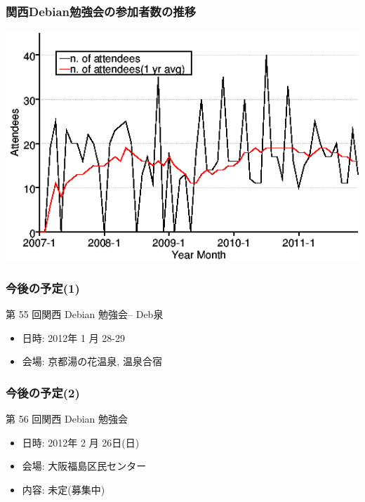 \documentclass[cjk,dvipdfmx,10pt,%
hyperref={bookmarks=true,bookmarksnumbered=true,bookmarksopen=false,%
colorlinks=false,%
pdftitle={第 54 回 関西 Debian 勉強会},%
pdfauthor={倉敷・のがた・佐々木},%
pdfsubject={資料},%
}]{beamer}
\begin{document}
\begin{frame}[fragile]
  \frametitle{関西Debian勉強会の参加者数の推移}
  \begin{center}
    \includegraphics[width=.8\vsize]{image201112/memberanalysis/kansai.png}
  \end{center}
\end{frame}



\begin{frame}[fragile]
\frametitle{今後の予定(1)}

\begin{block}{第 55 回関西 Debian 勉強会-- Deb泉}
  \begin{itemize}
  \item 日時: 2012年 1 月 28-29
  \item 会場: 京都湯の花温泉, 温泉合宿
  \end{itemize}
\end{block}

\end{frame}

\begin{frame}[fragile]
\frametitle{今後の予定(2)}

\begin{block}{第 56 回関西 Debian 勉強会}
  \begin{itemize}
  \item 日時: 2012年 2 月 26日(日)
  \item 会場: 大阪福島区民センター
  \item 内容: 未定(募集中)
  \end{itemize}
\end{block}
\end{frame}

\takahashi[50]{  }
\end{document}
